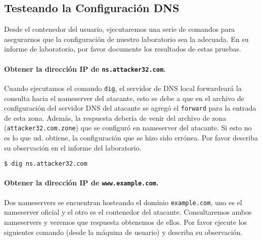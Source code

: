 

\subsection{Testeando la Configuración DNS}

Desde el contenedor del usuario, ejecutaremos una serie de comandos para asegurarnos que la configuración de nuestro laboratorio sea la adecuada. En su informe de laboratorio, por favor documente los resultados de estas pruebas.


\paragraph{Obtener la dirección IP de \texttt{ns.attacker32.com}.}
Cuando ejecutamos el comando \texttt{dig}, el servidor de DNS local forwardeará la consulta hacia el nameserver del atacante, esto se debe a que en el archivo de configuración del servidor DNS del atacante se agregó el \texttt{forward} para la entrada de esta zona. Además, la respuesta debería de venir del archivo de zona (\texttt{attacker32.com.zone}) que se configuró en nameserver del atacante.
Si esto no es lo que ud. obtiene, la configuración que se hizo sido errónea. Por favor describa su observación en el informe del laboratorio.

\begin{lstlisting}
$ dig ns.attacker32.com
\end{lstlisting}


\paragraph{Obtener la dirección IP de \texttt{www.example.com}.} 
Dos nameservers se encuentran hosteando el dominio \texttt{example.com}, uno es el nameserver oficial y el otro es el contenedor del atacante. Consultaremos ambos nameservers y veremos que respuesta obtenemos de ellos.
Por favor ejecute los siguientes comando (desde la máquina de usuario) y describa su observación.

